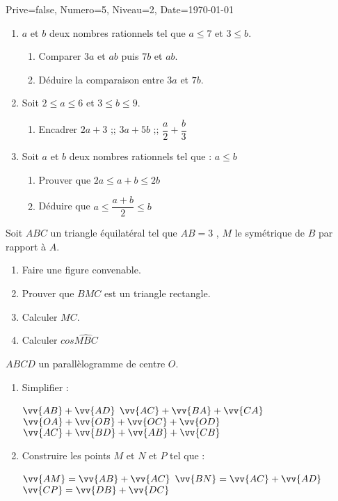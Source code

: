 \documentclass[a4paper,12pt]{article}
\begin{document}
\begin{Maquette}[DM]{Prive=false, Numero=5, Niveau=2, Date=\today}

\begin{exercice}
\begin{enumerate}
\item $a$ et $b$ deux nombres rationnels tel que $a\leq 7$ et $3\leq b$.
\begin{enumerate}
\item Comparer $3a$ et $ab$ puis $7b$ et $ab$.
\item Déduire la comparaison entre $3a$ et $7b$.
\end{enumerate}
\item Soit $2\leq a \leq 6$ et $3\leq b \leq 9$.
\begin{enumerate}
\item Encadrer $2a+3$ ;; $3a+5b$ ;; $\dfrac{a}{2}+\dfrac{b}{3}$
\end{enumerate}
\item Soit $a$ et $b$ deux nombres rationnels tel que : $a\leq b$
\begin{enumerate}
\item Prouver que $2a\leq a+b \leq 2b$
\item Déduire que $a \leq \dfrac{a+b}{2} \leq b$
\end{enumerate}
\end{enumerate}
\end{exercice}

\begin{exercice}
Soit $ABC$ un triangle équilatéral tel que $AB=3$ , $M$ le symétrique de $B$ par rapport à $A$.
\begin{enumerate}
\item Faire une figure convenable.
\item Prouver que $BMC$ est un triangle rectangle.
\item Calculer $MC$.
\item Calculer $cos\widehat{MBC}$
\end{enumerate}
\end{exercice}

\begin{exercice}
$ABCD$ un parallèlogramme de centre $O$.
\begin{enumerate}
\item Simplifier :

$\vv{AB}+\vv{AD}$\hspace{1cm}
$\vv{AC}+\vv{BA}+\vv{CA}$\hspace{1cm}
$\vv{OA}+\vv{OB}+\vv{OC}+\vv{OD}$\hspace{1cm}
$\vv{AC}+\vv{BD}+\vv{AB}+\vv{CB}$
\item Construire les points $M$ et $N$ et $P$ tel que :

$\vv{AM}=\vv{AB}+\vv{AC}$ \hspace{1cm}
$\vv{BN}=\vv{AC}+\vv{AD}$\hspace{1cm}
$\vv{CP}=\vv{DB}+\vv{DC}$
\end{enumerate}
\end{exercice}
\end{Maquette}
\end{document}
